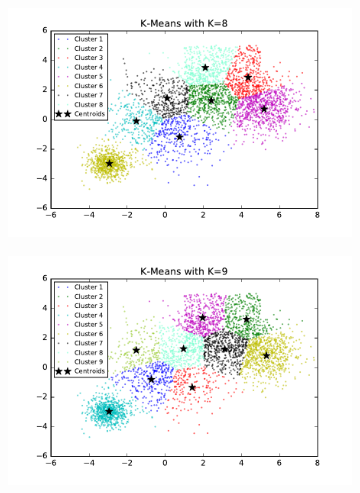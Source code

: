 \begin{description}
\begin{figure}[htb]
\begin{subfigure}[b]{0.475\textwidth}
        \end{subfigure}
        \hfill
        \begin{subfigure}[b]{0.475\textwidth}  
            \centering 
            \includegraphics[width=\textwidth]{./figures/bigClustering_kMeans_8.pdf}
        \end{subfigure}
        \begin{subfigure}[b]{0.475\textwidth}   
            \centering 
            \includegraphics[width=\textwidth]{./figures/bigClustering_kMeans_9.pdf}
        \end{subfigure}
        \hfill
        \begin{subfigure}[b]{0.475\textwidth}   
            \centering 

\end{subfigure}
\end{figure}
\end{description}
